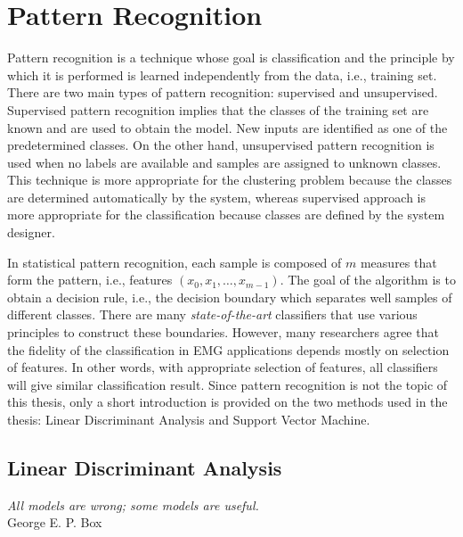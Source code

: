 \documentclass{article}
\begin{document}



\section{Pattern Recognition}

Pattern recognition is a technique whose goal is classification and the principle by which it is performed is learned independently from the data, i.e., training set. There are two main types of pattern recognition: supervised and unsupervised. Supervised pattern recognition implies that the classes of the training set are known and are used to obtain the model. New inputs are identified as one of the predetermined classes. On the other hand, unsupervised pattern recognition is used when no labels are available and samples are assigned to unknown classes. This technique is more appropriate for the clustering problem because the classes are determined automatically by the system, whereas supervised approach is more appropriate for the classification because classes are defined by the system designer.

In statistical pattern recognition, each sample is composed of $m$ measures that form the pattern, i.e., features $(x_0, x_1, \dots, x_{m-1})$. The goal of the algorithm is to obtain a decision rule, i.e., the decision boundary which separates well samples of different classes. There are many \emph{state-of-the-art} classifiers that use various principles to construct these boundaries. However, many researchers agree that the fidelity of the classification in EMG applications depends mostly on selection of features. In other words, with appropriate selection of features, all classifiers will give similar classification result. Since pattern recognition is not the topic of this thesis, only a short introduction is provided on the two methods used in the thesis: Linear Discriminant Analysis and Support Vector Machine.


\subsection{Linear Discriminant Analysis}

\begin{myquote}
\begin{flushright}
\textit{All models are wrong; some models are useful.} \\George E. P. Box
\end{flushright}
\end{myquote}
\end{document}

